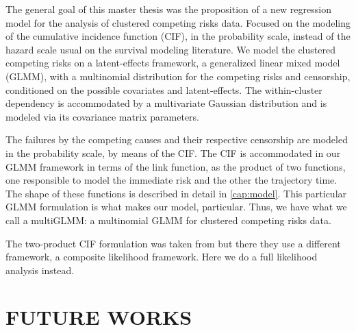 The general goal of this master thesis was the proposition of a new
regression model for the analysis of clustered competing risks
data. Focused on the modeling of the cumulative incidence function
(CIF), in the probability scale, instead of the hazard scale usual on
the survival modeling literature. We model the clustered competing risks
on a latent-effects framework, a generalized linear mixed model (GLMM),
with a multinomial distribution for the competing risks and censorship,
conditioned on the possible covariates and latent-effects. The
within-cluster dependency is accommodated by a multivariate Gaussian
distribution and is modeled via its covariance matrix parameters.

The failures by the competing causes and their respective censorship are
modeled in the probability scale, by means of the CIF. The CIF is
accommodated in our GLMM framework in terms of the link function, as the
product of two functions, one responsible to model the immediate risk
and the other the trajectory time. The shape of these functions is
described in detail in \autoref{cap:model}. This particular GLMM
formulation is what makes our model, particular. Thus, we have what we
call a multiGLMM: a multinomial GLMM for clustered competing risks data.

The two-product CIF formulation was taken from  but
there they use a different framework, a composite likelihood
framework. Here we do a full likelihood analysis instead.

\section{FUTURE WORKS}
\label{cap:future}

